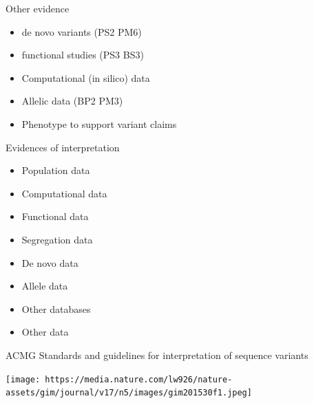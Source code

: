 \documentclass[
  ignorenonframetext,
]{beamer}
\providecommand{\tightlist}{%
  \setlength{\itemsep}{0pt}\setlength{\parskip}{0pt}}
\begin{document}
\begin{frame}{Other evidence}
\protect\hypertarget{other-evidence}{}

\begin{itemize}
\tightlist
\item
  de novo variants (PS2 PM6)
\item
  functional studies (PS3 BS3)
\item
  Computational (in silico) data\\
\item
  Allelic data (BP2 PM3)\\
\item
  Phenotype to support variant claims
\end{itemize}

\end{frame}

\begin{frame}{Evidences of interpretation}
\protect\hypertarget{evidences-of-interpretation}{}

\begin{itemize}
\tightlist
\item
  Population data\\
\item
  Computational data\\
\item
  Functional data\\
\item
  Segregation data\\
\item
  De novo data\\
\item
  Allele data\\
\item
  Other databases\\
\item
  Other data
\end{itemize}

\end{frame}

\begin{frame}{ACMG Standards and guidelines for interpretation of
sequence variants}
\protect\hypertarget{acmg-standards-and-guidelines-for-interpretation-of-sequence-variants}{}

\texttt{[image: https://media.nature.com/lw926/nature-assets/gim/journal/v17/n5/images/gim201530f1.jpeg]}

\end{frame}
\end{document}
